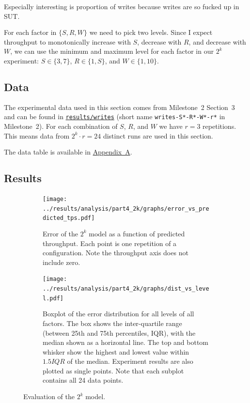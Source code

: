 \documentclass[11pt]{article}
\newcommand{\todo}[1]{\fcolorbox{black}{Apricot}{TODO: #1}}
\begin{document}
\todo{} Especially interesting is proportion of writes because writes are so fucked up in SUT.

For each factor in $\{S,R,W\}$ we need to pick two levels. Since I expect throughput to monotonically increase with $S$, decrease with $R$, and decrease with $W$, we can use the minimum and maximum level for each factor in our $2^k$ experiment: $S \in \{3, 7\}$, $R \in \{1, S\}$, and $W \in \{1, 10\}$.


\subsection{Data}

The experimental data used in this section comes from Milestone~2 Section~3 and can be found in \texttt{\href{https://gitlab.inf.ethz.ch/pungast/asl-fall16-project/tree/master/results/writes}{results/writes}} (short name \texttt{writes-S*-R*-W*-r*} in Milestone~2). For each combination of $S$, $R$, and $W$ we have $r=3$ repetitions. This means data from $2^k \cdot r = 24$ distinct runs are used in this section.

The data table is available in \hyperref[sec:appa]{Appendix~A}.

%

\subsection{Results}

\begin{figure}[h]
\centering
\begin{subfigure}[t]{0.49\textwidth}
\centering
\texttt{[image: ../results/analysis/part4\_2k/graphs/error\_vs\_predicted\_tps.pdf]}
\caption{Error of the $2^k$ model as a function of predicted throughput. Each point is one repetition of a configuration. Note the throughput axis does not include zero.}
\label{fig:part4:errorvspredicted}
\end{subfigure}
\begin{subfigure}[t]{0.49\textwidth}
\centering
\texttt{[image: ../results/analysis/part4\_2k/graphs/dist\_vs\_level.pdf]}
\caption{Boxplot of the error distribution for all levels of all factors. The box shows the inter-quartile range (between 25th and 75th percentiles, IQR), with the median shown as a horizontal line. The top and bottom whisker show the highest and lowest value within $1.5 IQR$ of the median. Experiment results are also plotted as single points. Note that each subplot contains all 24 data points.}
\label{fig:part4:errordistvslevel}
\end{subfigure}
\caption{Evaluation of the $2^k$ model.}
\end{figure}
\end{document}
